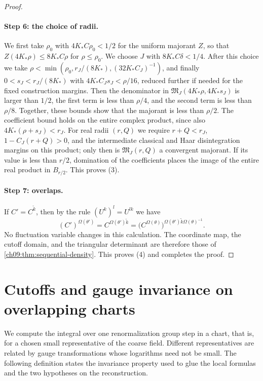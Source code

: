 \begin{proof}
\paragraph{Step 6: the choice of radii.}
We first take $\rho_0$ with $4K_*C\rho_0<1/2$ for the uniform majorant $Z$, so that $Z(4K_*\rho)\le8K_*C\rho$ for $\rho\le\rho_0$. We choose $J$ with $8K_*C\delta<1/4$. After this choice we take $\rho<\min(\rho_0,r_J/(8K_*),(32K_*C_J)^{-1})$, and finally $0<s_J<r_J/(8K_*)$ with $4K_*C_Js_J<\rho/16$, reduced further if needed for the fixed construction margins. Then the denominator in $\mathfrak M_J(4K_*\rho,4K_*s_J)$ is larger than $1/2$, the first term is less than $\rho/4$, and the second term is less than $\rho/8$. Together, these bounds show that the majorant is less than $\rho/2$. The coefficient bound holds on the entire complex product, since also $4K_*(\rho+s_J)<r_J$. For real radii $(r,Q)$ we require $r+Q<r_J$, $1-C_J(r+Q)>0$, and the intermediate classical and Haar disintegration margins on this product; only then is $\mathfrak M_J(r,Q)$ a convergent majorant. If its value is less than $r/2$, domination of the coefficients places the image of the entire real product in $B_{r/2}$. This proves (3).

\paragraph{Step 7: overlaps.}
If $C'=C^{\widetilde k}$, then by the rule $(U^k)^l=U^{lk}$ we have
\[
 (C')^{\Omega(\theta')}=C^{\Omega(\theta')\widetilde k}=\bigl(C^{\Omega(\theta)}\bigr)^{\Omega(\theta')\widetilde k\Omega(\theta)^{-1}}.
\]
No fluctuation variable changes in this calculation. The coordinate map, the cutoff domain, and the triangular determinant are therefore those of \cref{ch09:thm:sequential-density}. This proves (4) and completes the proof.
\end{proof}

\section{Cutoffs and gauge invariance on overlapping charts}\label{ch10:sec:cutoff}

We compute the integral over one renormalization group step in a chart, that is, for a chosen small representative of the coarse field. Different representatives are related by gauge transformations whose logarithms need not be small. The following definition states the invariance property used to glue the local formulas and the two hypotheses on the reconstruction.

